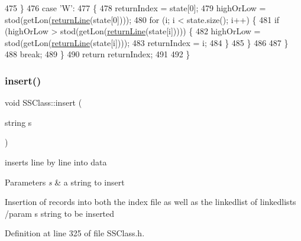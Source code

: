 \begin{DoxyCode}
475     \}
476     \textcolor{keywordflow}{case} \textcolor{charliteral}{'W'}:
477     \{
478         returnIndex = state[0];
479         highOrLow = stod(getLon(\hyperlink{classSSClass_ab0a8ea1af895df28359b5733bd920ef3}{returnLine}(state[0])));
480         \textcolor{keywordflow}{for} (i; i < state.size(); i++) \{
481             \textcolor{keywordflow}{if} (highOrLow > stod(getLon(\hyperlink{classSSClass_ab0a8ea1af895df28359b5733bd920ef3}{returnLine}(state[i])))) \{
482                 highOrLow = stod(getLon(\hyperlink{classSSClass_ab0a8ea1af895df28359b5733bd920ef3}{returnLine}(state[i])));
483                 returnIndex = i;
484             \}
485         \}
486 
487     \}
488     \textcolor{keywordflow}{break};
489     \}
490     \textcolor{keywordflow}{return} returnIndex;
491 
492 \}
\end{DoxyCode}
\mbox{\label{classSSClass_a45c5585c784bf7c4f823f66426664aea}} 
\subsubsection{\texorpdfstring{insert()}{insert()}}
{\footnotesize\ttfamily void S\+S\+Class\+::insert (\begin{DoxyParamCaption}\item[{string}]{s }\end{DoxyParamCaption})}



inserts line by line into data 


\begin{DoxyParams}{Parameters}
{\em s} & a string to insert\\
\hline
\end{DoxyParams}
Insertion of records into both the index file as well as the linkedlist of linkedlists /param s string to be inserted 

Definition at line 325 of file S\+S\+Class.\+h.


